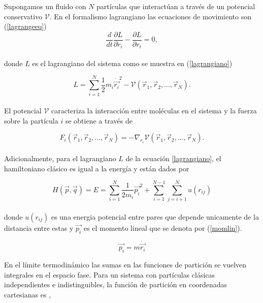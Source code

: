 Supongamos un fluido con $N$ partículas que interactúan a través de un potencial conservativo $\mathcal{V}$. En el formalismo lagrangiano las ecuaciones de movimiento son (\ref{lagrangeeq}) \cite{torresdelcastillo_2018}\\

\begin{equation} \label{lagrangeeq}
    \frac{d}{dt}\frac{\partial L}{\partial \dot r_i} - \frac{\partial L}{\partial r_i} = 0,
\end{equation}\\
donde $L$ es el lagrangiano del sistema como se muestra en (\ref{lagrangiano})

\begin{equation} \label{lagrangiano}
    L = \sum_{i=1}^{N} \frac{1}{2}m_i\dot{\vec{r_i}}^2-\mathcal{V}({\vec{r}}_1,{\vec{r}}_2,...,{\vec{r}}_N).
\end{equation}\\
El potencial $\mathcal{V}$ caracteriza la interacción entre moléculas en el sistema \cite{torresdelcastillo_2018} y la fuerza sobre la partícula $i$ se obtiene a través de

\begin{equation}
    F_i({\vec{r}}_1,{\vec{r}}_2,...,{\vec{r}}_N) = -\nabla_{r_i}\mathcal{V}({\vec{r}}_1,{\vec{r}}_2,...,{\vec{r}}_N).
\end{equation}\\

Adicionalmente, para el lagrangiano $L$ de la ecuación \ref{lagrangiano}, el hamiltoniano clásico es igual a la energía y están dados por

\begin{equation} \label{hamiltoniano}
    H(\vec{p},\vec{q}) = E = \sum_{i=1}^{N} \frac{1}{2 m_i}\vec{p_i}^2 + \sum_{i=1}^{N-1}\sum_{j=i+1}^{N} u(r_{ij})
\end{equation}\\

donde $u(r_{ij})$ es una energia potencial entre pares que depende unicamente de la distancia entre estas y $\vec{p_i}$ es el momento lineal que se denota por (\ref{momlin}).

\begin{equation}\label{momlin}
    \vec{p_i} = m\dot{\vec{r_i}}
\end{equation}

En el límite termodinámico las sumas en las funciones de partición se vuelven integrales en el espacio fase. Para un sistema con partículas clásicas independientes e indistinguibles, la función de partición en coordenadas cartesianas es \cite{mcquarrie1976},

